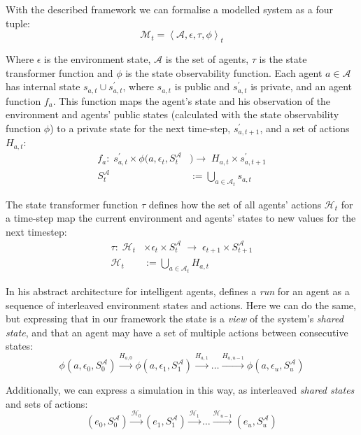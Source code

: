 With the described framework we can formalise a modelled system as a four tuple:
\begin{equation*}
\mathcal{M}_{t}=\left\langle \mathcal{A},\epsilon,\tau,\phi \right\rangle _{t}
\end{equation*}

Where $\epsilon$ is the environment state, $\mathcal{A}$ is the set of agents, $\tau$ is the state transformer function and $\phi$ is the state observability function. Each
agent $a\in\mathcal{A}$ has internal state $s_{a,t}\cup s_{a,t}^{\prime}$,
where $s_{a,t}$ is public and $s_{a,t}^{\prime}$ is private, and
an agent function $f_{a}$. This function maps the agent's state and his observation of the environment and agents' public states (calculated with the state observability function $\phi$) to a private
state for the next time-step, $s_{a,t+1}^{\prime}$, and a set of actions
$H{}_{a,t}$:
\begin{align*}
f_{a}:\; s_{a,t}^{\prime} \times \phi(a, \epsilon_{t}, S_{t}^{\mathcal{A}}&) \rightarrow\; H_{a,t}\times s_{a,t+1}^{\prime}\\
S_{t}^{\mathcal{A}}&:=\bigcup_{a\in\mathcal{A}_{t}}s_{a,t}
\end{align*}

The state transformer function $\tau$ defines how the set of all
agents' actions $\mathcal{H}_{t}$ for a time-step map the current
environment and agents' states to new values for the next timestep:
\begin{align*}
\tau:\;\mathcal{H}_{t}&\times\epsilon_{t}\times S_{t}^{\mathcal{A}}\;\rightarrow\;\epsilon_{t+1}\times S_{t+1}^{\mathcal{A}} \\
\mathcal{H}{}_{t}&:=\bigcup_{a\in\mathcal{A}_{t}}H_{a,t}
\end{align*}

In his abstract architecture for intelligent agents, \citet{Wooldridge2002}
defines a \emph{run} for an agent as a sequence of interleaved environment
states and actions. Here we can do the same, but expressing that in our
framework the state is a \emph{view} of the system's \emph{shared state}, and
that an agent may have a set of multiple actions between consecutive states:
\begin{equation*}
\phi(a, \epsilon_{0}, S_{0}^{\mathcal{A}}) \xrightarrow{H_{a,0}} \phi(a, \epsilon_{1}, S_{1}^{\mathcal{A}}) \xrightarrow{H_{a,1}}  \ldots \xrightarrow{H_{a,u-1}} \phi(a, \epsilon_{u}, S_{u}^{\mathcal{A}})
\end{equation*}

Additionally, we can express a simulation in this way, as interleaved \emph{
shared states} and sets of actions:
\begin{equation*}
(e_0, S_{0}^{\mathcal{A}}) \xrightarrow{\mathcal{H}_{0}} (e_1, S_{1}^{\mathcal{A}}) \xrightarrow{\mathcal{H}_{1}} \ldots \xrightarrow{\mathcal{H}_{u-1}} (e_u, S_{u}^{\mathcal{A}})
\end{equation*}


